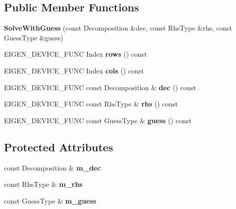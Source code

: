 \subsection*{Public Member Functions}
\begin{DoxyCompactItemize}
\item 
\mbox{\label{class_eigen_1_1_solve_with_guess_ae703bda1fcae1dc8d60078fdd4a8ca06}} 
{\bfseries Solve\+With\+Guess} (const Decomposition \&dec, const Rhs\+Type \&rhs, const Guess\+Type \&guess)
\item 
\mbox{\label{class_eigen_1_1_solve_with_guess_a24d826dd09bb375a5a171a4d7fea7238}} 
E\+I\+G\+E\+N\+\_\+\+D\+E\+V\+I\+C\+E\+\_\+\+F\+U\+NC Index {\bfseries rows} () const
\item 
\mbox{\label{class_eigen_1_1_solve_with_guess_a8e557813e4cd841435a4004adc39ac58}} 
E\+I\+G\+E\+N\+\_\+\+D\+E\+V\+I\+C\+E\+\_\+\+F\+U\+NC Index {\bfseries cols} () const
\item 
\mbox{\label{class_eigen_1_1_solve_with_guess_a1b6c66f5ae7156005a1d9c3034cabc88}} 
E\+I\+G\+E\+N\+\_\+\+D\+E\+V\+I\+C\+E\+\_\+\+F\+U\+NC const Decomposition \& {\bfseries dec} () const
\item 
\mbox{\label{class_eigen_1_1_solve_with_guess_a4f67d806525d7a0468d3128fc6a14610}} 
E\+I\+G\+E\+N\+\_\+\+D\+E\+V\+I\+C\+E\+\_\+\+F\+U\+NC const Rhs\+Type \& {\bfseries rhs} () const
\item 
\mbox{\label{class_eigen_1_1_solve_with_guess_a8192fcb557b83ddbf9a78783eeb931c1}} 
E\+I\+G\+E\+N\+\_\+\+D\+E\+V\+I\+C\+E\+\_\+\+F\+U\+NC const Guess\+Type \& {\bfseries guess} () const
\end{DoxyCompactItemize}
\subsection*{Protected Attributes}
\begin{DoxyCompactItemize}
\item 
\mbox{\label{class_eigen_1_1_solve_with_guess_ab9f552564073250e8093d05503dbe4a5}} 
const Decomposition \& {\bfseries m\+\_\+dec}
\item 
\mbox{\label{class_eigen_1_1_solve_with_guess_a5b3fe2344b9f82e8df3960152e87967c}} 
const Rhs\+Type \& {\bfseries m\+\_\+rhs}
\item 
\mbox{\label{class_eigen_1_1_solve_with_guess_a0943a61d3c7c8f4bb70828399a682fcf}} 
const Guess\+Type \& {\bfseries m\+\_\+guess}
\end{DoxyCompactItemize}


